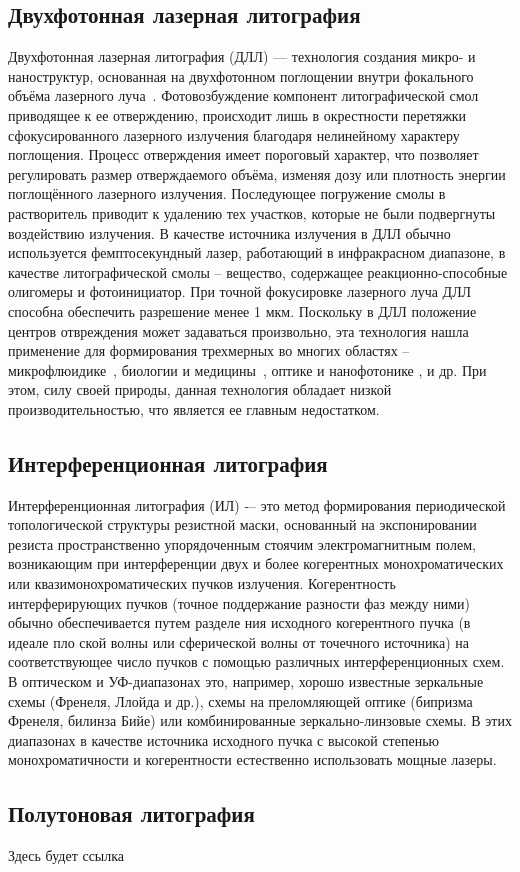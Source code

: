 \subsection{Двухфотонная лазерная литография}

Двухфотонная лазерная литография (ДЛЛ) — технология создания микро- и наноструктур, основанная на двухфотонном поглощении внутри фокального объёма лазерного луча~\cite{Hohmann2015, Kawata2001}. Фотовозбуждение компонент литографической смол приводящее к ее отверждению, происходит лишь в окрестности перетяжки сфокусированного лазерного излучения благодаря нелинейному характеру поглощения. Процесс отверждения имеет пороговый характер, что позволяет регулировать размер отверждаемого объёма, изменяя дозу или плотность энергии поглощённого лазерного излучения. Последующее погружение смолы в растворитель приводит к удалению тех участков, которые не были подвергнуты воздействию излучения. В качестве источника излучения в ДЛЛ обычно используется фемптосекундный лазер, работающий в инфракрасном диапазоне, в качестве литографической смолы -- вещество, содержащее реакционно-способные олигомеры и фотоинициатор. При точной фокусировке лазерного луча ДЛЛ способна обеспечить разрешение менее 1 мкм. Поскольку в ДЛЛ положение центров отвреждения может задаваться произвольно, эта технология нашла применение для формирования трехмерных во многих областях -- микрофлюидике~\cite{TPL_microfluidics_1, TPL_microfluidics_2}, биологии и медицины~\cite{TPL_biology_1, TPL_biology_2}, оптике и нанофотонике \cite{TPL_optics, TPL_nanophotonics}, и др. При этом, силу своей природы, данная технология обладает низкой производительностью, что является ее главным недостатком.


\subsection{Интерференционная литография}

Интерференционная литография (ИЛ) -– это метод формирования периодической топологической структуры резистной маски, основанный на экспонировании резиста пространственно упорядоченным стоячим электромагнитным полем, возникающим при интерференции двух и более когерентных монохроматических или квазимонохроматических пучков излучения. Когерентность интерферирующих пучков (точное поддержание разности фаз между ними) обычно обеспечивается путем разделе ния исходного когерентного пучка (в идеале пло ской волны или сферической волны от точечного источника) на соответствующее число пучков с помощью различных интерференционных схем. В оптическом и УФ-диапазонах это, например, хорошо известные зеркальные схемы (Френеля, Ллойда и др.), схемы на преломляющей оптике (бипризма Френеля, билинза Бийе) или комбинированные зеркально-линзовые схемы. В этих диапазонах в качестве источника исходного пучка с высокой степенью монохроматичности и когерентности естественно использовать мощные лазеры.


\subsection{Полутоновая литография}

Здесь будет ссылка \cite{TPL_1}






